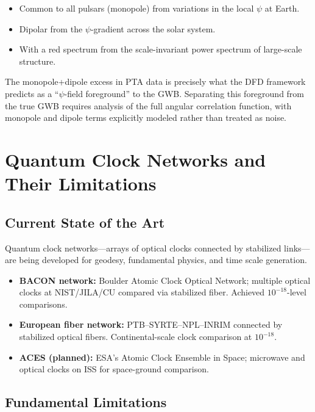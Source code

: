 \documentclass[12pt,letterpaper]{article}
\begin{document}
\begin{itemize}
\item Common to all pulsars (monopole) from variations in the local
$\psi$ at Earth.
\item Dipolar from the $\psi$-gradient across the solar system.
\item With a red spectrum from the scale-invariant power spectrum of
large-scale structure.
\end{itemize}

The monopole+dipole excess in PTA data is precisely what the DFD
framework predicts as a ``$\psi$-field foreground'' to the GWB. Separating
this foreground from the true GWB requires analysis of the full
angular correlation function, with monopole and dipole terms explicitly
modeled rather than treated as noise.

\section{Quantum Clock Networks and Their Limitations}

\subsection{Current State of the Art}

Quantum clock networks---arrays of optical clocks connected by stabilized
links---are being developed for geodesy, fundamental physics, and
time scale generation.

\begin{itemize}
\item \textbf{BACON network:} Boulder Atomic Clock Optical Network;
multiple optical clocks at NIST/JILA/CU compared via stabilized fiber.
Achieved $10^{-18}$-level comparisons.
\item \textbf{European fiber network:} PTB--SYRTE--NPL--INRIM connected
by stabilized optical fibers. Continental-scale clock comparison at
$10^{-18}$.
\item \textbf{ACES (planned):} ESA's Atomic Clock Ensemble in Space;
microwave and optical clocks on ISS for space-ground comparison.
\end{itemize}

\subsection{Fundamental Limitations}
\end{document}
